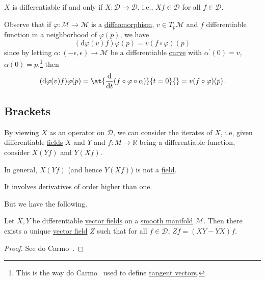 \begin{remark}
	\(X\) is differentiable if and only if \(X\colon \mathcal{D} \to \mathcal{D} \), i.e., \(Xf\in \mathcal{D} \) for all \(f\in \mathcal{D} \).
\end{remark}

Observe that if \(\varphi \colon \mathcal{M} \to \mathcal{M} \) is a \hyperref[def:diffeomorphism]{diffeomorphism}, \(v\in T_p \mathcal{M} \)  and \(f\) differentiable function in a neighborhood of \(\varphi (p)\), we have
\[
	(\mathrm{d} \varphi (v)f)\varphi (p) = v(f\circ \varphi )(p)
\]
since by letting \(\alpha \colon (-\epsilon , \epsilon ) \to \mathcal{M} \) be a differentiable \hyperref[def:curve]{curve} with \(\alpha ^\prime (0) = v\), \(\alpha (0)= p\),\footnote{This is the way do Carmo~\cite{flaherty2013riemannian} used to define \hyperref[def:tangent-vector]{tangent vectors}.} then
\[
	(\mathrm{d} \varphi (v) f) \varphi (p) = \at{\frac{\mathrm{d}}{\mathrm{d}t} (f \circ \varphi \circ \alpha )}{t=0}{} = v(f \circ \varphi )(p).
\]

\subsection{Brackets}
By viewing \(X\) as an operator on \(\mathcal{D} \), we can consider the iterates of \(X\), i.e, given differentiable \hyperref[def:vector-field]{fields} \(X\) and \(Y\) and \(f\colon M \to \mathbb{R} \) being a differentiable function, consider \(X(Y f)\) and \(Y(X f)\).

\begin{note}
	In general, \(X(Y f)\) (and hence \(Y(X f)\)) is not a \hyperref[def:vector-field]{field}.
\end{note}
\begin{explanation}
	It involves derivatives of order higher than one.
\end{explanation}

But we have the following.

\begin{lemma}
	Let \(X, Y\) be differentiable \hyperref[def:vector-field]{vector fields} on a \hyperref[def:smooth-manifold]{smooth manifold} \(\mathcal{M} \). Then there exists a unique \hyperref[def:vector-field]{vector field} \(Z\) such that for all \(f\in \mathcal{D} \), \(Zf = (XY - YX)f\).
\end{lemma}
\begin{proof}
	See do Carmo~\cite[Chapter 0, Lemma 5.2]{flaherty2013riemannian}.
\end{proof}

